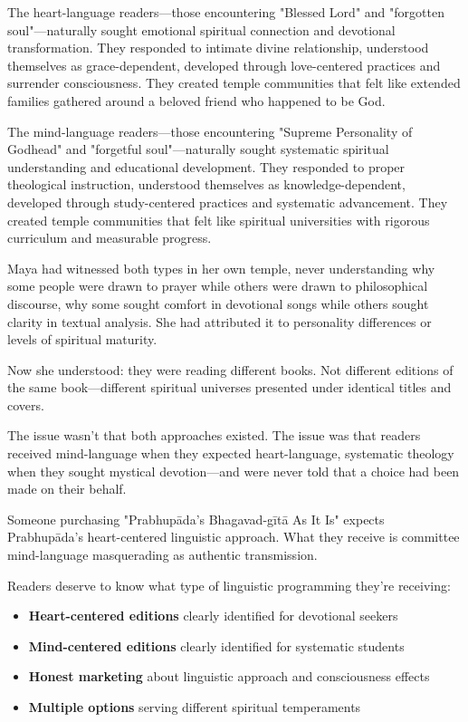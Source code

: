 \documentclass[12pt,twoside]{book}
\begin{document}
The heart-language readers—those encountering "Blessed Lord" and "forgotten soul"—naturally sought emotional spiritual connection and devotional transformation. They responded to intimate divine relationship, understood themselves as grace-dependent, developed through love-centered practices and surrender consciousness. They created temple communities that felt like extended families gathered around a beloved friend who happened to be God.

The mind-language readers—those encountering "Supreme Personality of Godhead" and "forgetful soul"—naturally sought systematic spiritual understanding and educational development. They responded to proper theological instruction, understood themselves as knowledge-dependent, developed through study-centered practices and systematic advancement. They created temple communities that felt like spiritual universities with rigorous curriculum and measurable progress.

Maya had witnessed both types in her own temple, never understanding why some people were drawn to prayer while others were drawn to philosophical discourse, why some sought comfort in devotional songs while others sought clarity in textual analysis. She had attributed it to personality differences or levels of spiritual maturity.

Now she understood: they were reading different books. Not different editions of the same book—different spiritual universes presented under identical titles and covers.

The issue wasn't that both approaches existed. The issue was that readers received mind-language when they expected heart-language, systematic theology when they sought mystical devotion—and were never told that a choice had been made on their behalf.

Someone purchasing "Prabhupāda's Bhagavad-gītā As It Is" expects Prabhupāda's heart-centered linguistic approach. What they receive is committee mind-language masquerading as authentic transmission.

Readers deserve to know what type of linguistic programming they're receiving:

\begin{itemize}
\item \textbf{\textbf{Heart-centered editions}} clearly identified for devotional seekers
\item \textbf{\textbf{Mind-centered editions}} clearly identified for systematic students
\item \textbf{\textbf{Honest marketing}} about linguistic approach and consciousness effects
\item \textbf{\textbf{Multiple options}} serving different spiritual temperaments
\end{itemize}
\end{document}
